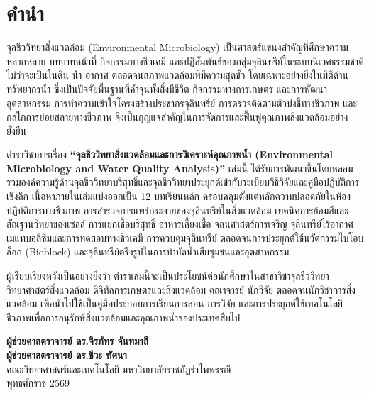 \chapter*{คำนำ}

จุลชีววิทยาสิ่งแวดล้อม (Environmental Microbiology) เป็นศาสตร์แขนงสำคัญที่ศึกษาความหลากหลาย บทบาทหน้าที่ กิจกรรมทางชีวเคมี และปฏิสัมพันธ์ของกลุ่มจุลินทรีย์ในระบบนิเวศธรรมชาติ ไม่ว่าจะเป็นในดิน น้ำ อากาศ ตลอดจนสภาพแวดล้อมที่มีความสุดขั้ว โดยเฉพาะอย่างยิ่งในมิติด้านทรัพยากรน้ำ ซึ่งเป็นปัจจัยพื้นฐานที่ค้ำจุนทั้งสิ่งมีชีวิต กิจกรรมทางการเกษตร และการพัฒนาอุตสาหกรรม การทำความเข้าใจโครงสร้างประชากรจุลินทรีย์ การตรวจติดตามตัวบ่งชี้ทางชีวภาพ และกลไกการย่อยสลายทางชีวภาพ จึงเป็นกุญแจสำคัญในการจัดการและฟื้นฟูคุณภาพสิ่งแวดล้อมอย่างยั่งยืน

ตำราวิชาการเรื่อง \textbf{``จุลชีววิทยาสิ่งแวดล้อมและการวิเคราะห์คุณภาพน้ำ (Environmental Microbiology and Water Quality Analysis)''} เล่มนี้ ได้รับการพัฒนาขึ้นโดยหลอมรวมองค์ความรู้ด้านจุลชีววิทยาบริสุทธิ์และจุลชีววิทยาประยุกต์เข้ากับระเบียบวิธีวิจัยและคู่มือปฏิบัติการเชิงลึก เนื้อหาภายในเล่มแบ่งออกเป็น 12 บทเรียนหลัก ครอบคลุมตั้งแต่หลักความปลอดภัยในห้องปฏิบัติการทางชีวภาพ การสำรวจการแพร่กระจายของจุลินทรีย์ในสิ่งแวดล้อม เทคนิคการย้อมสีและสัณฐานวิทยาของเซลล์ การแยกเชื้อบริสุทธิ์ อาหารเลี้ยงเชื้อ จลนศาสตร์การเจริญ จุลินทรีย์ไร้อากาศ เมแทบอลิซึมและการทดสอบทางชีวเคมี การควบคุมจุลินทรีย์ ตลอดจนการประยุกต์ใช้นวัตกรรมไบโอบล็อก (Bioblock) และจุลินทรีย์ตรึงรูปในการบำบัดน้ำเสียชุมชนและอุตสาหกรรม

ผู้เรียบเรียงหวังเป็นอย่างยิ่งว่า ตำราเล่มนี้จะเป็นประโยชน์ต่อนักศึกษาในสาขาวิชาจุลชีววิทยา วิทยาศาสตร์สิ่งแวดล้อม ดิจิทัลการเกษตรและสิ่งแวดล้อม คณาจารย์ นักวิจัย ตลอดจนนักวิชาการสิ่งแวดล้อม เพื่อนำไปใช้เป็นคู่มือประกอบการเรียนการสอน การวิจัย และการประยุกต์ใช้เทคโนโลยีชีวภาพเพื่อการอนุรักษ์สิ่งแวดล้อมและคุณภาพน้ำของประเทศสืบไป

\vspace{1.5cm}
\begin{flushright}
    \textbf{ผู้ช่วยศาสตราจารย์ ดร.จิรภัทร จันทมาลี}\\[2pt]
    \textbf{ผู้ช่วยศาสตราจารย์ ดร.ชีวะ ทัศนา}\\[4pt]
    คณะวิทยาศาสตร์และเทคโนโลยี มหาวิทยาลัยราชภัฏรำไพพรรณี\\[2pt]
    พุทธศักราช 2569
\end{flushright}
\clearpage
